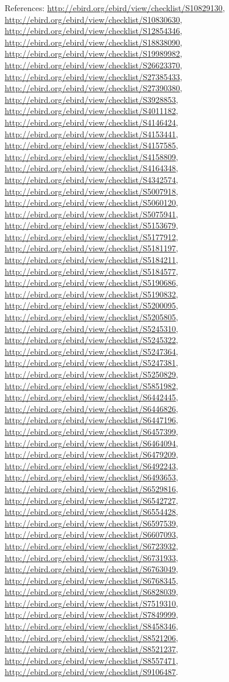\documentclass[9pt, article]{memoir}
\begin{document}
\begin{multicols}{2}
\vspace{6pt}References: 
\url{http://ebird.org/ebird/view/checklist/S10829130}, 
\url{http://ebird.org/ebird/view/checklist/S10830630}, 
\url{http://ebird.org/ebird/view/checklist/S12854346}, 
\url{http://ebird.org/ebird/view/checklist/S18838090}, 
\url{http://ebird.org/ebird/view/checklist/S19989982}, 
\url{http://ebird.org/ebird/view/checklist/S26623370}, 
\url{http://ebird.org/ebird/view/checklist/S27385433}, 
\url{http://ebird.org/ebird/view/checklist/S27390380}, 
\url{http://ebird.org/ebird/view/checklist/S3928853}, 
\url{http://ebird.org/ebird/view/checklist/S4011182}, 
\url{http://ebird.org/ebird/view/checklist/S4146424}, 
\url{http://ebird.org/ebird/view/checklist/S4153441}, 
\url{http://ebird.org/ebird/view/checklist/S4157585}, 
\url{http://ebird.org/ebird/view/checklist/S4158809}, 
\url{http://ebird.org/ebird/view/checklist/S4164348}, 
\url{http://ebird.org/ebird/view/checklist/S4342574}, 
\url{http://ebird.org/ebird/view/checklist/S5007918}, 
\url{http://ebird.org/ebird/view/checklist/S5060120}, 
\url{http://ebird.org/ebird/view/checklist/S5075941}, 
\url{http://ebird.org/ebird/view/checklist/S5153679}, 
\url{http://ebird.org/ebird/view/checklist/S5177912}, 
\url{http://ebird.org/ebird/view/checklist/S5181197}, 
\url{http://ebird.org/ebird/view/checklist/S5184211}, 
\url{http://ebird.org/ebird/view/checklist/S5184577}, 
\url{http://ebird.org/ebird/view/checklist/S5190686}, 
\url{http://ebird.org/ebird/view/checklist/S5190832}, 
\url{http://ebird.org/ebird/view/checklist/S5200095}, 
\url{http://ebird.org/ebird/view/checklist/S5205805}, 
\url{http://ebird.org/ebird/view/checklist/S5245310}, 
\url{http://ebird.org/ebird/view/checklist/S5245322}, 
\url{http://ebird.org/ebird/view/checklist/S5247364}, 
\url{http://ebird.org/ebird/view/checklist/S5247381}, 
\url{http://ebird.org/ebird/view/checklist/S5250829}, 
\url{http://ebird.org/ebird/view/checklist/S5851982}, 
\url{http://ebird.org/ebird/view/checklist/S6442445}, 
\url{http://ebird.org/ebird/view/checklist/S6446826}, 
\url{http://ebird.org/ebird/view/checklist/S6447196}, 
\url{http://ebird.org/ebird/view/checklist/S6457399}, 
\url{http://ebird.org/ebird/view/checklist/S6464094}, 
\url{http://ebird.org/ebird/view/checklist/S6479209}, 
\url{http://ebird.org/ebird/view/checklist/S6492243}, 
\url{http://ebird.org/ebird/view/checklist/S6493653}, 
\url{http://ebird.org/ebird/view/checklist/S6529816}, 
\url{http://ebird.org/ebird/view/checklist/S6542727}, 
\url{http://ebird.org/ebird/view/checklist/S6554428}, 
\url{http://ebird.org/ebird/view/checklist/S6597539}, 
\url{http://ebird.org/ebird/view/checklist/S6607093}, 
\url{http://ebird.org/ebird/view/checklist/S6723932}, 
\url{http://ebird.org/ebird/view/checklist/S6731933}, 
\url{http://ebird.org/ebird/view/checklist/S6763049}, 
\url{http://ebird.org/ebird/view/checklist/S6768345}, 
\url{http://ebird.org/ebird/view/checklist/S6828039}, 
\url{http://ebird.org/ebird/view/checklist/S7519310}, 
\url{http://ebird.org/ebird/view/checklist/S7849999}, 
\url{http://ebird.org/ebird/view/checklist/S8458346}, 
\url{http://ebird.org/ebird/view/checklist/S8521206}, 
\url{http://ebird.org/ebird/view/checklist/S8521237}, 
\url{http://ebird.org/ebird/view/checklist/S8557471}, 
\url{http://ebird.org/ebird/view/checklist/S9106487}.


\end{multicols}
\end{document}
